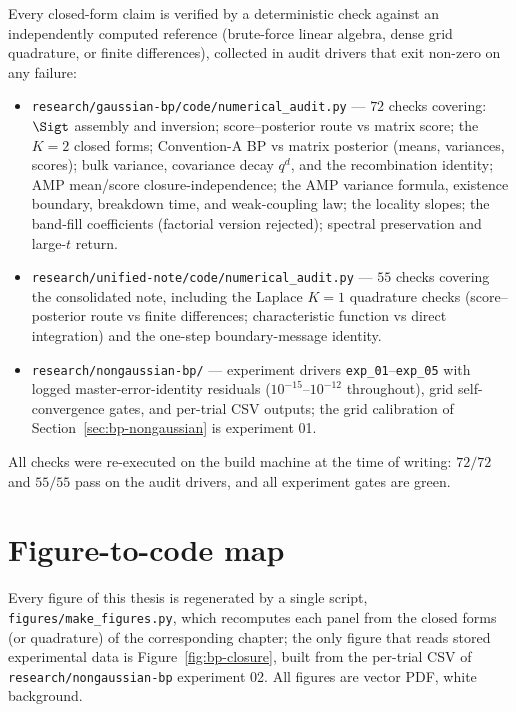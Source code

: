 Every closed-form claim is verified by a deterministic check against an
independently computed reference (brute-force linear algebra, dense grid
quadrature, or finite differences), collected in audit drivers that exit
non-zero on any failure:
\begin{itemize}
  \item \texttt{research/gaussian-bp/code/numerical\_audit.py} --- $72$
  checks covering: $\Sigt$ assembly and inversion; score--posterior route vs matrix score;
  the $K = 2$ closed forms; Convention-A BP vs matrix posterior (means,
  variances, scores); bulk variance, covariance decay $q^d$, and the
  recombination identity; AMP mean/score closure-independence; the AMP
  variance formula, existence boundary, breakdown time, and weak-coupling
  law; the locality slopes; the band-fill coefficients (factorial version
  rejected); spectral preservation and large-$t$ return.
  \item \texttt{research/unified-note/code/numerical\_audit.py} --- $55$
  checks covering the consolidated note, including the Laplace $K = 1$
  quadrature checks (score--posterior route vs finite differences; characteristic
  function vs direct integration) and the one-step boundary-message
  identity.
  \item \texttt{research/nongaussian-bp/} --- experiment drivers
  \texttt{exp\_01}--\texttt{exp\_05} with logged master-error-identity
  residuals ($10^{-15}$--$10^{-12}$ throughout), grid self-convergence
  gates, and per-trial CSV outputs; the grid calibration of
  Section~\ref{sec:bp-nongaussian} is experiment 01.
\end{itemize}
All checks were re-executed on the build machine at the time of writing:
$72/72$ and $55/55$ pass on the audit drivers, and all experiment gates
are green.

\section{Figure-to-code map}

Every figure of this thesis is regenerated by a single script,
\texttt{figures/make\_figures.py}, which recomputes each panel from the
closed forms (or quadrature) of the corresponding chapter; the only
figure that reads stored experimental data is
Figure~\ref{fig:bp-closure}, built from the per-trial CSV of
\texttt{research/nongaussian-bp} experiment 02. All figures are vector
PDF, white background.

